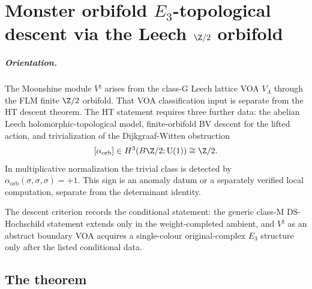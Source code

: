 %

\chapter[Monster orbifold E\_3 descent]{Monster orbifold
$E_3$-topological descent via the Leech $\Z/2$ orbifold}
\label{ch:monster-chain-level-e3-top-platonic}

\paragraph{Orientation.}
The Moonshine module $V^\natural$ arises from the class-G Leech
lattice VOA $V_\Lambda$ through the FLM finite $\Z/2$ orbifold. That VOA
classification input is separate from the HT descent theorem. The HT statement
requires three further data: the abelian Leech holomorphic-topological
model, finite-orbifold BV descent for the lifted action, and
trivialization of the Dijkgraaf-Witten obstruction
\[
 [\alpha_{\mathrm{orb}}]\in H^3(B\Z/2;\mathrm{U}(1))\cong \Z/2.
\]
In multiplicative normalization the trivial class is detected by
$\alpha_{\mathrm{orb}}(\sigma,\sigma,\sigma)=+1$. This sign is an
anomaly datum or a separately verified local computation, separate
from the determinant identity.

The descent criterion records the conditional statement: the
generic class-M DS-Hochschild statement extends only in the
weight-completed ambient, and $V^\natural$ as
an abstract boundary VOA acquires a single-colour
original-complex $E_3$ structure only after the listed conditional data.

\section{The theorem}
\label{sec:monster-chain-level-e3-top-statement}

